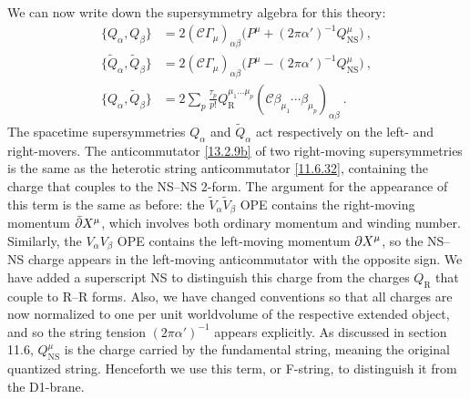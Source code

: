We can now write down the supersymmetry algebra for this theory:
\begin{subequations} \label{13.2.9}
	\begin{align}
		\{Q_\alpha, Q_\beta\} &= 2(\mathcal{C}\Gamma_\mu)_{\alpha\beta}\bigl(P^\mu + (2\pi\alpha')^{-1}Q_{\mathrm{NS}}^\mu\bigr) \:, \label{13.2.9a} \\
		\{\tilde{Q}_\alpha, \tilde{Q}_\beta\} &= 2(\mathcal{C}\Gamma_\mu)_{\alpha\beta}\bigl(P^\mu - (2\pi\alpha')^{-1}Q_{\mathrm{NS}}^\mu\bigr) \:, \label{13.2.9b} \\
		\{Q_\alpha, \tilde{Q}_\beta\} &= 2\sum_{p}\frac{\tau_p}{p!}Q_{\mathrm{R}}^{\mu_1\dots\mu_p}(\mathcal{C}\beta_{\mu_1}\cdots\beta_{\mu_p})_{\alpha\beta} \:. \label{13.2.9c}
	\end{align}
\end{subequations}
The spacetime supersymmetries $Q_\alpha$ and $\tilde{Q}_\alpha$ act respectively on the left- and right-movers. The anticommutator \eqref{13.2.9b} of two right-moving supersymmetries is the same as the heterotic string anticommutator \eqref{11.6.32}, containing the charge that couples to the NS--NS 2-form. The argument for the appearance of this term is the same as before: the $\tilde{V}_\alpha\tilde{V}_\beta$ OPE contains the right-moving momentum $\bar{\partial}X^\mu$, which involves both ordinary momentum and winding number. Similarly, the $V_\alpha V_\beta$ OPE contains the left-moving momentum $\partial X^\mu$, so the NS--NS charge appears in the left-moving anticommutator with the opposite sign. We have added a superscript NS to distinguish this charge from the charges $Q_{\mathrm{R}}$ that couple to R--R forms. Also, we have changed conventions so that all charges are now normalized to one per unit worldvolume of the respective extended object, and so the string tension $(2\pi\alpha')^{-1}$ appears explicitly. As discussed in section 11.6, $Q_{\mathrm{NS}}^\mu$ is the charge carried by the fundamental string, meaning the original quantized string. Henceforth we use this term, or F-string, to distinguish it from the D1-brane.

